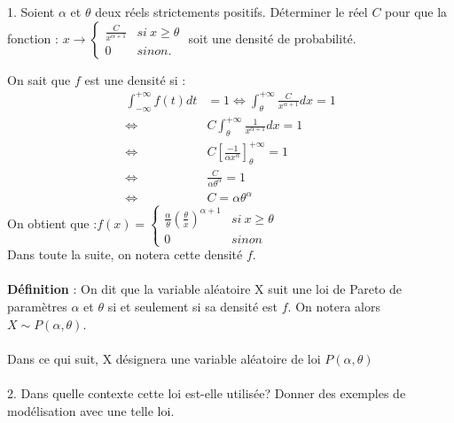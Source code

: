 \documentclass{article}
\begin{document}
1. Soient $\alpha$ et $\theta$ deux réels strictements positifs.
Déterminer le réel $C$ pour que la fonction : $x\rightarrow\begin{cases}
\frac{C}{x^{\alpha+1}} & si\ x\geq\theta\\
0 & sinon.
\end{cases}$ soit une densité de probabilité.

On sait que $f$ est une densité si :
\begin{align*}
\int_{-\infty}^{+\infty}f(t)dt & =1\Leftrightarrow\int_{\theta}^{+\infty}\frac{C}{x^{\alpha+1}}dx=1\\
\Leftrightarrow & C\int_{\theta}^{+\infty}\frac{1}{x^{\alpha+1}}dx=1\\
\Leftrightarrow & C[\frac{-1}{\alpha x^{\alpha}}]_{\theta}^{+\infty}=1\\
\Leftrightarrow & \frac{C}{\alpha\theta^{\alpha}}=1\\
\Leftrightarrow & C=\alpha\theta^{\alpha}
\end{align*}
On obtient que :$f(x)=\begin{cases}
\frac{\alpha}{\theta}(\frac{\theta}{x})^{\alpha+1} & si\ x\geq\theta\\
0 & sinon
\end{cases}$\\
Dans toute la suite, on notera cette densité $f$.\\
\\
\textbf{Définition} : On dit que la variable aléatoire X suit une
loi de Pareto de paramètres $\alpha$ et $\theta$ si et seulement
si sa densité est $f.$ On notera alors $X\sim P(\alpha,\theta).$\\
\\
Dans ce qui suit, X désignera une variable aléatoire de loi $P(\alpha,\theta)$\\
\\
2. Dans quelle contexte cette loi est-elle utilisée? Donner des exemples
de modélisation avec une telle loi.\\
\end{document}
